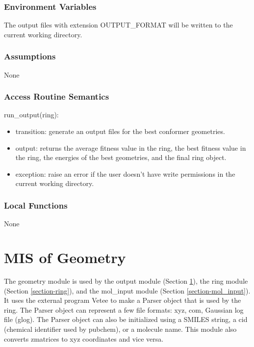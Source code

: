 \documentclass[12pt, titlepage]{article}
\begin{document}
\subsubsection{Environment Variables}

The output files with extension OUTPUT\_FORMAT will be written to the current 
working directory.

\subsubsection{Assumptions}

None

\subsubsection{Access Routine Semantics}

\noindent run\_output(ring):
\begin{itemize}
	\item transition: generate an output files for the best conformer 
	geometries.
	\item output: returns the average fitness value in the ring, the best 
	fitness value in the ring, the energies of the best geometries, and the 
	final ring object.
	\item exception: raise an error if the user doesn't have write permissions 
	in the current working directory.
\end{itemize}

\subsubsection{Local Functions}

None

\section{MIS of Geometry} \label{section-geometry}

The geometry module is used by the output module (Section 
\ref{section-geometry}), the ring module (Section \ref{section-ring}), and the 
mol\_input module (Section \ref{section-mol_input}). It uses the external 
program Vetee to make a Parser object that is used by the ring. The Parser 
object can represent a few file formats: xyz, com, Gaussian log file (glog). 
The Parser object can also be initialized using a SMILES string, a cid 
(chemical identifier used by pubchem), or a molecule name. This module also 
converts zmatrices to xyz coordinates and vice versa. 
\end{document}
